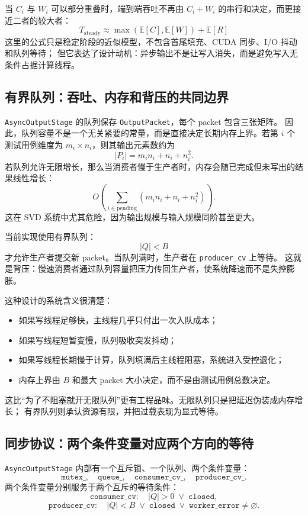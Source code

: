 当 $C_i$ 与 $W_i$ 可以部分重叠时，端到端吞吐不再由 $C_i+W_i$ 的串行和决定，而更接近二者的较大者：
\[
    T_{\mathrm{steady}}
    \approx
    \max(\mathbb{E}[C],\mathbb{E}[W])
    +
    \mathbb{E}[R]
\]
这里的公式只是稳定阶段的近似模型，不包含首尾填充、CUDA 同步、I/O 抖动和队列等待；
但它表达了设计动机：异步输出不是让写入消失，而是避免写入无条件占据计算线程。

\subsection{有界队列：吞吐、内存和背压的共同边界}

\texttt{AsyncOutputStage} 的队列保存 \texttt{OutputPacket}，每个 packet 包含三张矩阵。
因此，队列容量不是一个无关紧要的常量，而是直接决定长期内存上界。若第 $i$ 个测试用例维度为
$m_i\times n_i$，则其输出元素数约为
\[
    |P_i|
    =
    m_i n_i + n_i + n_i^2.
\]
若队列允许无限增长，那么当消费者慢于生产者时，内存会随已完成但未写出的结果线性增长：
\[
    O\left(\sum_{i\in\mathrm{pending}} (m_i n_i+n_i+n_i^2)\right).
\]
这在 SVD 系统中尤其危险，因为输出规模与输入规模同阶甚至更大。

当前实现使用有界队列：
\[
    |Q| < B
\]
才允许生产者提交新 packet。当队列满时，生产者在 \texttt{producer\_cv} 上等待。
这就是背压：慢速消费者通过队列容量把压力传回生产者，使系统降速而不是失控膨胀。

这种设计的系统含义很清楚：

\begin{itemize}
    \item 如果写线程足够快，主线程几乎只付出一次入队成本；
    \item 如果写线程短暂变慢，队列吸收突发抖动；
    \item 如果写线程长期慢于计算，队列填满后主线程阻塞，系统进入受控退化；
    \item 内存上界由 $B$ 和最大 packet 大小决定，而不是由测试用例总数决定。
\end{itemize}

这比“为了不阻塞就开无限队列”更有工程品味。无限队列只是把延迟伪装成内存增长；
有界队列则承认资源有限，并把过载表现为显式等待。

\subsection{同步协议：两个条件变量对应两个方向的等待}

\texttt{AsyncOutputStage} 内部有一个互斥锁、一个队列、两个条件变量：
\[
    \texttt{mutex\_},\quad
    \texttt{queue\_},\quad
    \texttt{consumer\_cv\_},\quad
    \texttt{producer\_cv\_}.
\]
两个条件变量分别服务于两个互斥的等待条件：
\[
    \texttt{consumer\_cv}: \quad |Q|>0 \;\lor\; \texttt{closed},
\]
\[
    \texttt{producer\_cv}: \quad |Q|<B \;\lor\; \texttt{closed} \;\lor\; \texttt{worker\_error}\ne\varnothing.
\]

